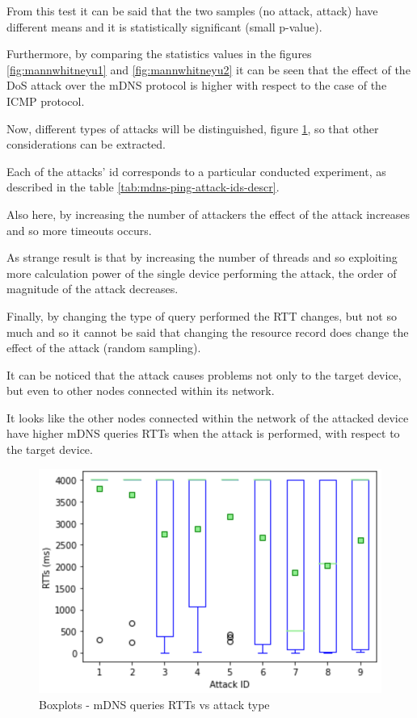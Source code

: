 \documentclass[fleqn, 11pt]{SelfArx} %
\begin{document}
From this test it can be said that the two samples (no attack, attack) have different means and it is statistically significant (small p-value).

Furthermore, by comparing the statistics values in the figures \ref{fig:mannwhitneyu1} and \ref{fig:mannwhitneyu2} it can be seen that the effect of the DoS attack over the mDNS protocol is higher with respect to the case of the ICMP protocol. \newline

Now, different types of attacks will be distinguished, figure \ref{fig:mdns-boxplot2}, so that other considerations can be extracted.

Each of the attacks' id corresponds to a particular conducted experiment, as described in the table \ref{tab:mdns-ping-attack-ids-descr}.

Also here, by increasing the number of attackers the effect of the attack increases and so more timeouts occurs.

As strange result is that by increasing the number of threads and so exploiting more calculation power of the single device performing the attack, the order of magnitude of the attack decreases. \newline

Finally, by changing the type of query performed the RTT changes, but not so much and so it cannot be said that changing the resource record does change the effect of the attack (random sampling).

It can be noticed that the attack causes problems not only to the target device, but even to other nodes connected within its network.

It looks like the other nodes connected within the network of the attacked device have higher mDNS queries RTTs when the attack is performed, with respect to the target device.

\begin{figure}[H]
	\centering
    \includegraphics[width=\linewidth]{./mdns/mdns-boxplot2.png}
    \caption{Boxplots - mDNS queries RTTs vs attack type}
	\label{fig:mdns-boxplot2}
\end{figure}
\end{document}
